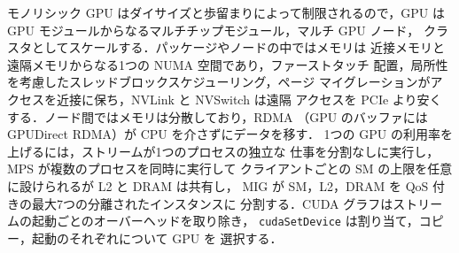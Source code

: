 \documentclass[../main.tex]{subfiles}
\begin{document}
\begin{keypoint}[章のまとめ]
  モノリシック GPU はダイサイズと歩留まりによって制限されるので，GPU は
  GPU モジュールからなるマルチチップモジュール，マルチ GPU ノード，
  クラスタとしてスケールする．パッケージやノードの中ではメモリは
  近接メモリと遠隔メモリからなる1つの NUMA 空間であり，ファーストタッチ
  配置，局所性を考慮したスレッドブロックスケジューリング，ページ
  マイグレーションがアクセスを近接に保ち，NVLink と NVSwitch は遠隔
  アクセスを PCIe より安くする．ノード間ではメモリは分散しており，RDMA
  （GPU のバッファには GPUDirect RDMA）が CPU を介さずにデータを移す．
  1つの GPU の利用率を上げるには，ストリームが1つのプロセスの独立な
  仕事を分割なしに実行し，MPS が複数のプロセスを同時に実行して
  クライアントごとの SM の上限を任意に設けられるが L2 と DRAM は共有し，
  MIG が SM，L2，DRAM を QoS 付きの最大7つの分離されたインスタンスに
  分割する．CUDA グラフはストリームの起動ごとのオーバーヘッドを取り除き，
  \texttt{cudaSetDevice} は割り当て，コピー，起動のそれぞれについて GPU を
  選択する．
\end{keypoint}
\end{document}
